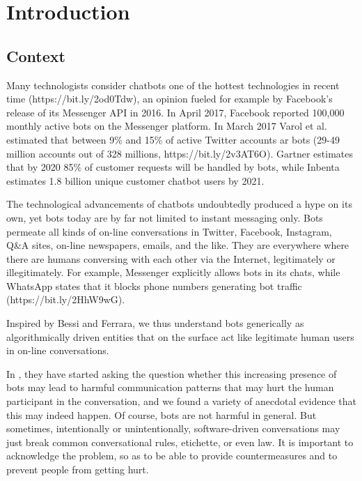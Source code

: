 \chapter{Introduction}
\label{Introduction}
\thispagestyle{empty}


\section{Context}
Many technologists consider chatbots one of the hottest technologies in recent time (https://bit.ly/2od0Tdw), an opinion fueled for example by Facebook’s release of its Messenger API in 2016. In April 2017, Facebook reported 100,000 monthly active bots on the Messenger platform. In March 2017 Varol et al.\cite{Varol} estimated that between 9\% and 15\% of active Twitter accounts ar bots (29-49 million accounts out of 328 millions, https://bit.ly/2v3AT6O). Gartner estimates that by 2020 85\% of customer requests will be handled by bots, while Inbenta estimates 1.8 billion unique customer chatbot users by 2021.\cite{inbenta}

The technological advancements of chatbots undoubtedly produced a hype on its own, yet bots today are by far not limited to instant messaging only. Bots permeate all kinds of on-line conversations in Twitter, Facebook, Instagram, Q\&A sites, on-line newspapers, emails, and the like. They are everywhere where there are humans conversing with each other via the Internet, legitimately or illegitimately. For example, Messenger explicitly allows bots in its chats, while WhatsApp states that it blocks phone numbers generating bot traffic (https://bit.ly/2HhW9wG).

Inspired by Bessi and Ferrara, \cite{bessi} we thus understand bots generically as algorithmically driven entities that on the surface act like legitimate human users in on-line conversations.

In \cite{DanielIC2019}, they have started asking the question whether this increasing presence of bots may lead to harmful communication patterns that may hurt the human participant in the conversation, and we found a variety of anecdotal evidence that this may indeed happen. Of course, bots are not harmful in general. But sometimes, intentionally or unintentionally, software-driven conversations may just break common conversational rules, etichette, or even law. It is important to acknowledge the problem, so as to be able to provide countermeasures and to prevent people from getting hurt.

